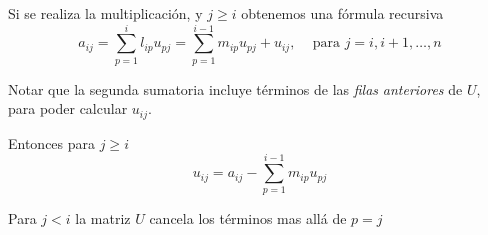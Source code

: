 \documentclass[
]{article}
\begin{document}
Si se realiza la multiplicación, y \(j\geq i\) obtenemos una fórmula
recursiva \begin{equation}
  a_{ij} = \sum_{p=1}^{i} l_{ip}u_{pj} = \sum_{p=1}^{i-1}m_{ip}u_{pj} + u_{ij},\,\,\,\,\, 
  \mbox{ para } j=i,i+1,\ldots,n
\end{equation}

Notar que la segunda sumatoria incluye términos de las \emph{filas}
\emph{anteriores} de \(U\), para poder calcular \(u_{ij}\).

Entonces para \(j\geq i\) \begin{equation}
u_{ij} = a_{ij} - \sum_{p=1}^{i-1} m_{ip}u_{pj}
\end{equation}

Para \(j<i\) la matriz \(U\) cancela los términos mas allá de \(p=j\)
\end{document}
